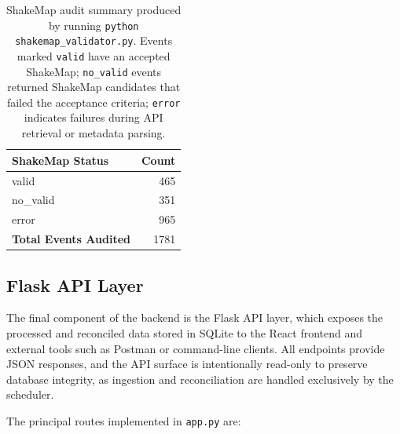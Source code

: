 \documentclass[12pt]{article}
\begin{document}
\begin{table}[H]
\centering
\begin{tabular}{l r}
\hline
\textbf{ShakeMap Status} & \textbf{Count} \\
\hline
valid          & 465 \\
no\_valid      & 351 \\
error          & 965 \\
\hline
\textbf{Total Events Audited} & 1781 \\
\hline
\end{tabular}
\caption{ShakeMap audit summary produced by running 
\texttt{python shakemap\_validator.py}. 
Events marked \texttt{valid} have an accepted ShakeMap; 
\texttt{no\_valid} events returned ShakeMap candidates that failed the acceptance criteria; 
\texttt{error} indicates failures during API retrieval or metadata parsing.}
\label{tab:shakemap-audit}
\end{table}

\subsection{Flask API Layer}

The final component of the backend is the Flask API layer, which exposes the processed and reconciled data stored in SQLite to the React frontend and external tools such as Postman or command-line clients. All endpoints provide JSON responses, and the API surface is intentionally read-only to preserve database integrity, as ingestion and reconciliation are handled exclusively by the scheduler.

The principal routes implemented in \texttt{app.py} are:
\end{document}
